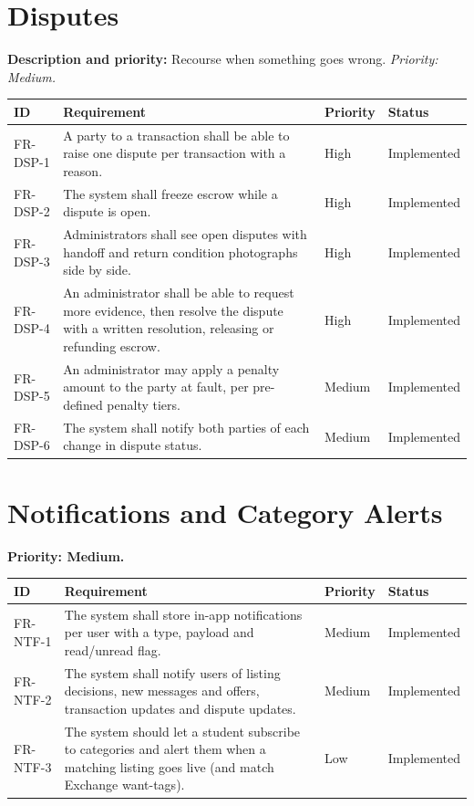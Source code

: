 \documentclass[11pt,a4paper]{scrreprt}
\newenvironment{reqtable}{%
  \small
  \begin{longtable}{>{\raggedright\arraybackslash\ttfamily\footnotesize}p{2.05cm} L{8.85cm} L{1.45cm} L{2.05cm}}
  \toprule
  \normalfont\normalsize\textbf{ID} & \textbf{Requirement} & \textbf{Priority} & \textbf{Status}\\
  \midrule\endhead
  \bottomrule\endfoot
}{\end{longtable}}
\newcommand{\impl}{Implemented}
\begin{document}
\section{Disputes}
\textbf{Description and priority:} Recourse when something goes wrong.
\emph{Priority: Medium.}

\begin{reqtable}
FR-DSP-1 & A party to a transaction shall be able to raise one dispute per transaction with a reason. & High & \impl\\
FR-DSP-2 & The system shall freeze escrow while a dispute is open. & High & \impl\\
FR-DSP-3 & Administrators shall see open disputes with handoff and return condition photographs side by side. & High & \impl\\
FR-DSP-4 & An administrator shall be able to request more evidence, then resolve the dispute with a written resolution, releasing or refunding escrow. & High & \impl\\
FR-DSP-5 & An administrator may apply a penalty amount to the party at fault, per pre-defined penalty tiers. & Medium & \impl\\
FR-DSP-6 & The system shall notify both parties of each change in dispute status. & Medium & \impl\\
\end{reqtable}

\section{Notifications and Category Alerts}
\textbf{Priority: Medium.}
\begin{reqtable}
FR-NTF-1 & The system shall store in-app notifications per user with a type, payload and read/unread flag. & Medium & \impl\\
FR-NTF-2 & The system shall notify users of listing decisions, new messages and offers, transaction updates and dispute updates. & Medium & \impl\\
FR-NTF-3 & The system should let a student subscribe to categories and alert them when a matching listing goes live (and match Exchange want-tags). & Low & \impl\\
\end{reqtable}

\end{document}
